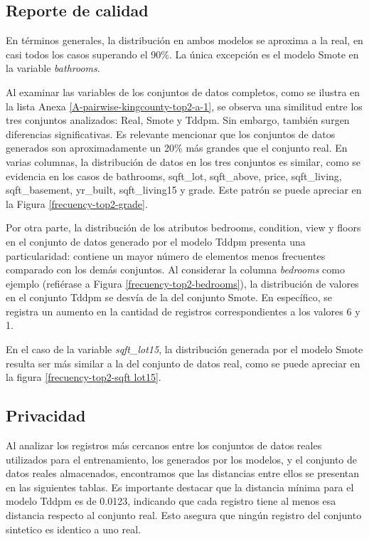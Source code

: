 
\newpage
\subsection{Reporte de calidad}
\label{calidad-kingcounty}
En términos generales, la distribución en ambos modelos se aproxima a la real, en casi todos los casos superando el 90\%. La única excepción es el modelo Smote en la variable \emph{bathrooms}.


\newpage
Al examinar las variables de los conjuntos de datos completos, como se ilustra en la lista Anexa \ref{A-pairwise-kingcounty-top2-a-1}, se observa una similitud entre los tres conjuntos analizados: Real, Smote y Tddpm. Sin embargo, también surgen diferencias significativas. Es relevante mencionar que los conjuntos de datos generados son aproximadamente un 20\% más grandes que el conjunto real. En varias columnas, la distribución de datos en los tres conjuntos es similar, como se evidencia en los casos de bathrooms, sqft\_lot, sqft\_above, price, sqft\_living, sqft\_basement, yr\_built, sqft\_living15 y grade. Este patrón se puede apreciar en la Figura \ref{frecuency-top2-grade}.



\newpage
Por otra parte, la distribución de los atributos bedrooms, condition, view y floors en el conjunto de datos generado por el modelo Tddpm presenta una particularidad: contiene un mayor número de elementos menos frecuentes comparado con los demás conjuntos. Al considerar la columna \emph{bedrooms} como ejemplo (refiérase a Figura \ref{frecuency-top2-bedrooms}), la distribución de valores en el conjunto Tddpm se desvía de la del conjunto Smote. En específico, se registra un aumento en la cantidad de registros correspondientes a los valores 6 y 1.



\newpage
En el caso de la variable \emph{sqft\_lot15}, la distribución generada por el modelo Smote resulta ser más similar a la del conjunto de datos real, como se puede apreciar en la figura \ref{frecuency-top2-sqft lot15}.


\newpage
\subsection{Privacidad}
\label{privacidad-kingcounty}
Al analizar los registros más cercanos entre los conjuntos de datos reales utilizados para el entrenamiento, los generados por los modelos, y el conjunto de datos reales almacenados, encontramos que las distancias entre ellos se presentan en las siguientes tablas. Es importante destacar que la distancia mínima para el modelo Tddpm es de 0.0123, indicando que cada registro tiene al menos esa distancia respecto al conjunto real. Esto asegura que ningún registro del conjunto sintetico es identico a uno real.


